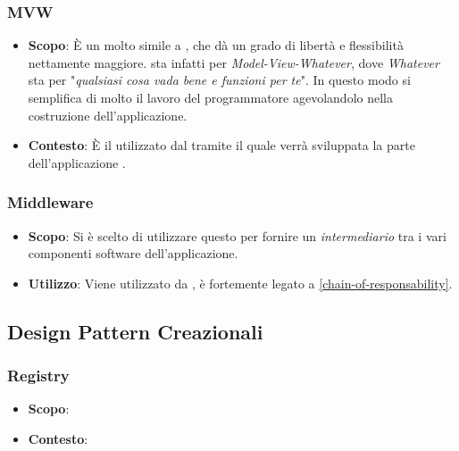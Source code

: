 \subsubsection{MVW}

\begin{itemize}

	\item \textbf{Scopo}: È un  molto simile a , che dà un grado di libertà e flessibilità nettamente maggiore.  sta infatti per \textit{Model-View-Whatever}, dove \textit{Whatever} sta per "\textit{qualsiasi cosa vada bene e funzioni per te}". In questo modo si semplifica di molto il lavoro del programmatore agevolandolo nella costruzione dell'applicazione.
	\item \textbf{Contesto}: È il  utilizzato dal   tramite il quale verrà sviluppata la parte  dell'applicazione .

\end{itemize}

\subsubsection{Middleware} 

\begin{itemize}

	\item \textbf{Scopo}: Si è scelto di utilizzare questo  per fornire un \textit{intermediario} tra i vari componenti software dell'applicazione.
	\item \textbf{Utilizzo}: Viene utilizzato da , è fortemente legato a \ref{chain-of-responsability}.

\end{itemize}

\subsection{Design Pattern Creazionali}

\subsubsection{Registry}

\begin{itemize}

	\item \textbf{Scopo}:
	\item \textbf{Contesto}:

\end{itemize}

